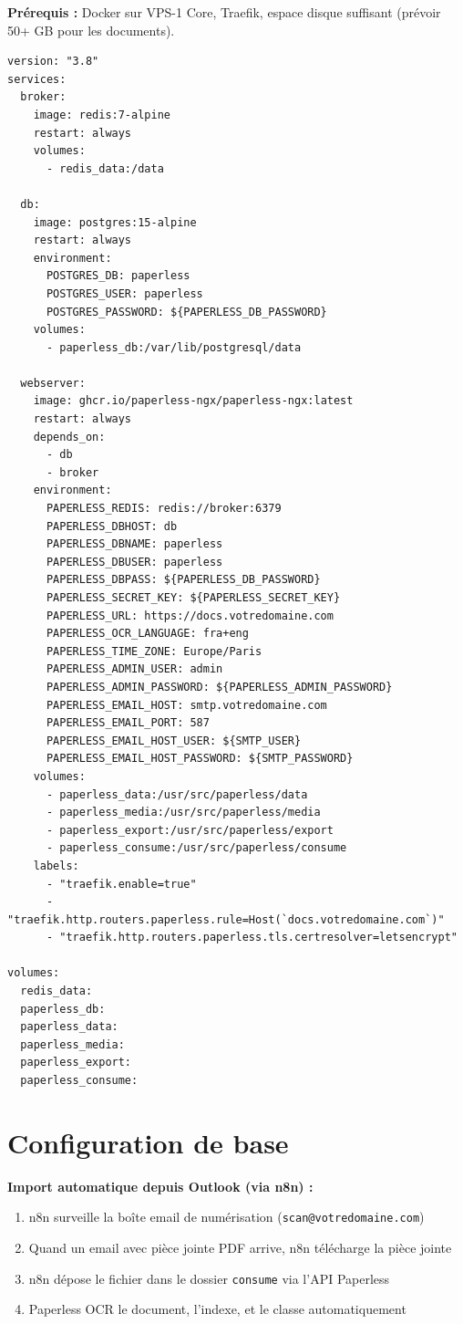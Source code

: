 \documentclass[11pt, a4paper]{article}
\begin{document}
\textbf{Prérequis :} Docker sur VPS-1 Core, Traefik, espace disque suffisant (prévoir 50+ GB pour les documents).

\begin{lstlisting}[style=yamlstyle, caption={docker-compose.yml — Paperless-ngx complet}]
version: "3.8"
services:
  broker:
    image: redis:7-alpine
    restart: always
    volumes:
      - redis_data:/data

  db:
    image: postgres:15-alpine
    restart: always
    environment:
      POSTGRES_DB: paperless
      POSTGRES_USER: paperless
      POSTGRES_PASSWORD: ${PAPERLESS_DB_PASSWORD}
    volumes:
      - paperless_db:/var/lib/postgresql/data

  webserver:
    image: ghcr.io/paperless-ngx/paperless-ngx:latest
    restart: always
    depends_on:
      - db
      - broker
    environment:
      PAPERLESS_REDIS: redis://broker:6379
      PAPERLESS_DBHOST: db
      PAPERLESS_DBNAME: paperless
      PAPERLESS_DBUSER: paperless
      PAPERLESS_DBPASS: ${PAPERLESS_DB_PASSWORD}
      PAPERLESS_SECRET_KEY: ${PAPERLESS_SECRET_KEY}
      PAPERLESS_URL: https://docs.votredomaine.com
      PAPERLESS_OCR_LANGUAGE: fra+eng
      PAPERLESS_TIME_ZONE: Europe/Paris
      PAPERLESS_ADMIN_USER: admin
      PAPERLESS_ADMIN_PASSWORD: ${PAPERLESS_ADMIN_PASSWORD}
      PAPERLESS_EMAIL_HOST: smtp.votredomaine.com
      PAPERLESS_EMAIL_PORT: 587
      PAPERLESS_EMAIL_HOST_USER: ${SMTP_USER}
      PAPERLESS_EMAIL_HOST_PASSWORD: ${SMTP_PASSWORD}
    volumes:
      - paperless_data:/usr/src/paperless/data
      - paperless_media:/usr/src/paperless/media
      - paperless_export:/usr/src/paperless/export
      - paperless_consume:/usr/src/paperless/consume
    labels:
      - "traefik.enable=true"
      - "traefik.http.routers.paperless.rule=Host(`docs.votredomaine.com`)"
      - "traefik.http.routers.paperless.tls.certresolver=letsencrypt"

volumes:
  redis_data:
  paperless_db:
  paperless_data:
  paperless_media:
  paperless_export:
  paperless_consume:
\end{lstlisting}

\section{Configuration de base}

\textbf{Import automatique depuis Outlook (via n8n) :}
\begin{enumerate}
  \item n8n surveille la boîte email de numérisation (\texttt{scan@votredomaine.com})
  \item Quand un email avec pièce jointe PDF arrive, n8n télécharge la pièce jointe
  \item n8n dépose le fichier dans le dossier \texttt{consume} via l'API Paperless
  \item Paperless OCR le document, l'indexe, et le classe automatiquement
\end{enumerate}
\end{document}
